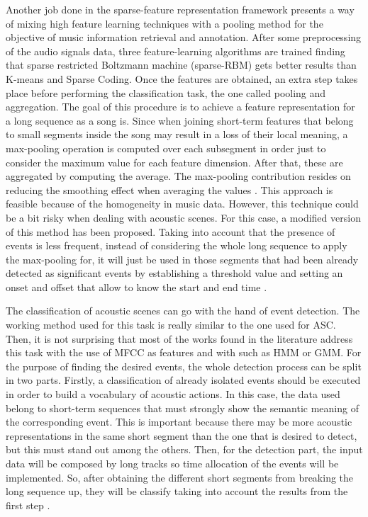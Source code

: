 Another job done in the sparse-feature representation framework presents a way of mixing high feature learning techniques with a pooling method for the objective of music information retrieval and annotation. After some preprocessing of the audio signals data, three feature-learning algorithms are trained finding that sparse restricted Boltzmann machine (sparse-RBM) gets better results than K-means and Sparse Coding. Once the features are obtained, an extra step takes place before performing the classification task, the one called pooling and aggregation. The goal of this procedure is to achieve a feature representation for a long sequence as a song is. Since when joining short-term features that belong to small segments inside the song may result in a loss of their local meaning, a max-pooling operation is computed over each subsegment in order just to consider the maximum value for each feature dimension. After that, these are aggregated by computing the average. The max-pooling contribution resides on reducing the smoothing effect when averaging the values \cite{Nam2012}. This approach is feasible because of the homogeneity in music data. However, this technique could be a bit risky when dealing with acoustic scenes. For this case, a modified version of this method has been proposed. Taking into account that the presence of events is less frequent, instead of considering the whole long sequence to apply the max-pooling for, it will just be used in those segments that had been already detected as significant events by establishing a threshold value and setting an onset and offset that allow to know the start and end time \cite{Lee2013}.

The classification of acoustic scenes can go with the hand of event detection. The working method used for this task is really similar to the one used for ASC. Then, it is not surprising that most of the works found in the literature address this task with the use of MFCC as features and with such as HMM or GMM. For the purpose of finding the desired events, the whole detection process can be split in two parts. Firstly, a classification of already isolated events should be executed in order to build a vocabulary of acoustic actions. In this case, the data used belong to short-term sequences that must strongly show the semantic meaning of the corresponding event. This is important because there may be more acoustic representations in the same short segment than the one that is desired to detect, but this must stand out among the others.  Then, for the detection part, the input data will be composed by long tracks so time allocation of the events will be implemented. So, after obtaining the different short segments from breaking the long sequence up, they will be classify taking into account the results from the first step \cite{Mesaros2010}. 

